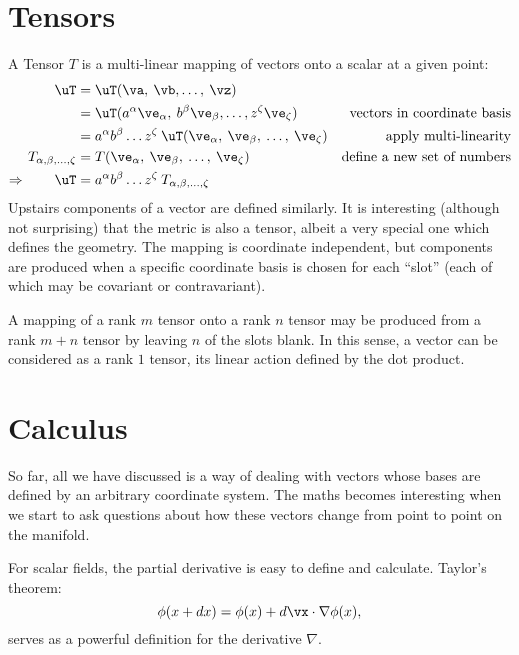 \section{Tensors}
A Tensor $T$ is a multi-linear mapping of vectors onto a scalar at a given point:
\begin{align}
  \uT 
  &= 
  \uT(\va,\:\vb,\ldots,\:\vz)
  &
  \nonumber
  \\
  &= 
  \uT(a^\alpha\ve_\alpha,\:b^\beta\ve_\beta,\ldots,z^\zeta\ve_\zeta)  
  &\text{vectors in coordinate basis}
  \nonumber
  \\
  &= 
  a^\alpha b^\beta \ldots z^\zeta \: 
  \uT(\ve_\alpha,\:\ve_\beta,\:\ldots,\:\ve_\zeta)  
  &\text{apply multi-linearity}
  \nonumber
  \\
  T_{\alpha,\beta,\ldots,\zeta} 
  &=  
  T(\ve_\alpha,\:\ve_\beta,\:\ldots,\:\ve_\zeta)
  &\text{define a new set of numbers}
  \nonumber
  \\
  \Rightarrow\qquad
  \uT
  &= 
  a^\alpha b^\beta \ldots z^\zeta \: 
  T_{\alpha,\beta,\ldots,\zeta}
  &
  \nonumber
\end{align}
Upstairs components of a vector are defined similarly. It is interesting (although not surprising) that the metric is also a tensor, albeit a very special one which defines the geometry. The mapping is coordinate independent, but components are produced when a specific coordinate basis is chosen for each ``slot'' (each of which may be covariant or contravariant).

A mapping of a rank $m$ tensor onto a rank $n$ tensor may be produced from a rank $m+n$ tensor by leaving $n$ of the slots blank. In this sense, a vector can be considered as a rank $1$ tensor, its linear action defined by the dot product.

\section{Calculus}
So far, all we have discussed is a way of dealing with vectors whose bases are defined by an arbitrary coordinate system. The maths becomes interesting when we start to ask questions about how these vectors change from point to point on the manifold.

For scalar fields, the partial derivative is easy to define and calculate. Taylor's theorem:
\begin{equation}
  \phi(x+dx) = \phi(x) + d\vx\cdot\nabla\phi(x),
  \label{eqn:dg:taylor_scalar}
\end{equation}
serves as a powerful definition for the derivative $\nabla$.

